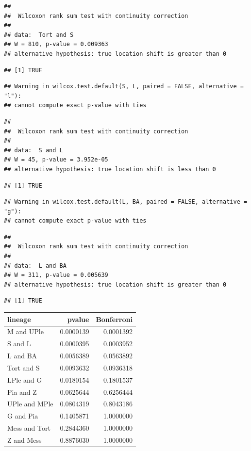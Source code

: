 \documentclass[]{article}
\begin{document}
\begin{verbatim}
## 
##  Wilcoxon rank sum test with continuity correction
## 
## data:  Tort and S
## W = 810, p-value = 0.009363
## alternative hypothesis: true location shift is greater than 0
\end{verbatim}

\begin{verbatim}
## [1] TRUE
\end{verbatim}

\begin{verbatim}
## Warning in wilcox.test.default(S, L, paired = FALSE, alternative = "l"):
## cannot compute exact p-value with ties
\end{verbatim}

\begin{verbatim}
## 
##  Wilcoxon rank sum test with continuity correction
## 
## data:  S and L
## W = 45, p-value = 3.952e-05
## alternative hypothesis: true location shift is less than 0
\end{verbatim}

\begin{verbatim}
## [1] TRUE
\end{verbatim}

\begin{verbatim}
## Warning in wilcox.test.default(L, BA, paired = FALSE, alternative = "g"):
## cannot compute exact p-value with ties
\end{verbatim}

\begin{verbatim}
## 
##  Wilcoxon rank sum test with continuity correction
## 
## data:  L and BA
## W = 311, p-value = 0.005639
## alternative hypothesis: true location shift is greater than 0
\end{verbatim}

\begin{verbatim}
## [1] TRUE
\end{verbatim}

\begin{longtable}[]{@{}lrr@{}}
\toprule
lineage & pvalue & Bonferroni\tabularnewline
\midrule
\endhead
M and UPle & 0.0000139 & 0.0001392\tabularnewline
S and L & 0.0000395 & 0.0003952\tabularnewline
L and BA & 0.0056389 & 0.0563892\tabularnewline
Tort and S & 0.0093632 & 0.0936318\tabularnewline
LPle and G & 0.0180154 & 0.1801537\tabularnewline
Pia and Z & 0.0625644 & 0.6256444\tabularnewline
UPle and MPle & 0.0804319 & 0.8043186\tabularnewline
G and Pia & 0.1405871 & 1.0000000\tabularnewline
Mess and Tort & 0.2844360 & 1.0000000\tabularnewline
Z and Mess & 0.8876030 & 1.0000000\tabularnewline
\bottomrule
\end{longtable}
\end{document}
